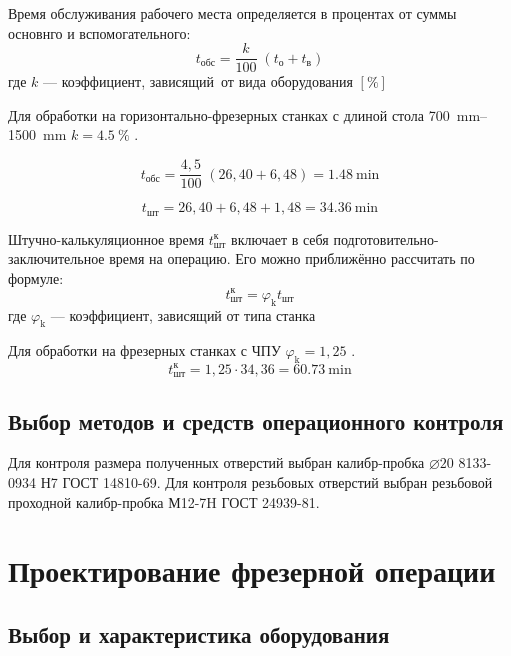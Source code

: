 \documentclass[14pt,russian,a4paper]{extreport}
\begin{document}
Время обслуживания рабочего места определяется в процентах от суммы основнго и вспомогательного: 
\begin{equation}
  t_\text{обс} = \frac{k}{100} \; (t_\text{о} + t_\text{в})
\end{equation}
где $k$ --- коэффициент, зависящий от вида оборудования $[\%]$

Для обработки на горизонтально-фрезерных станках с длиной стола \SIrange{700}{1500}{\milli\meter} $ k = \SI{4,5}{\percent} $ \cite[прил.~5]{malzen:normirovanie}.

\begin{equation*}
  t_\text{обс} = \frac{4,5}{100} \; (26,40 + 6,48) = \SI{1,48}{\minute}
\end{equation*}

\begin{equation*}
  t_\text{шт} = 26,40 + 6,48 + 1,48 = \SI{34,36}{\minute}
\end{equation*}

Штучно-калькуляционное время $t_\text{шт}^\text{к}$ включает в себя подготовительно-заключительное время на операцию. Его можно приближённо рассчитать по формуле: 
\begin{equation}
  t_\text{шт}^\text{к} = \varphi_\text{k} t_\text{шт}
\end{equation}
где $\varphi_\text{k}$ --- коэффициент, зависящий от типа станка

Для обработки на фрезерных станках с ЧПУ $ \varphi_\text{k} = 1,25 $ \cite[прил.~7]{malzen:normirovanie}.
\begin{equation*}
  t_\text{шт}^\text{к} = 1,25 \cdot 34,36 = \SI{60,73}{\minute}
\end{equation*}


\subsection{Выбор методов и средств операционного контроля}

Для контроля размера полученных отверстий выбран калибр-пробка $\diameter 20$ 8133-0934 Н7 ГОСТ 14810-69. Для контроля резьбовых отверстий выбран резьбовой проходной калибр-пробка М12-7H ГОСТ 24939-81.

\section{Проектирование фрезерной операции}

\subsection{Выбор и характеристика оборудования}
\end{document}
